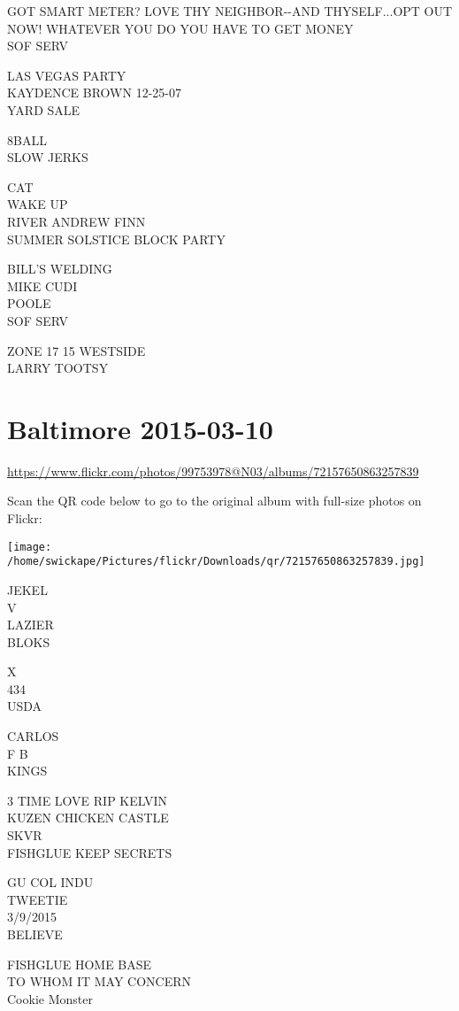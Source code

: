 \documentclass[10pt,letterpaper]{article}
\begin{document}
GOT SMART METER? LOVE THY NEIGHBOR{-}{-}AND THYSELF...OPT OUT NOW!  WHATEVER YOU DO YOU HAVE TO GET MONEY\\
SOF SERV

LAS VEGAS PARTY\\
KAYDENCE BROWN 12{-}25{-}07\\
YARD SALE

8BALL\\
SLOW JERKS

CAT\\
WAKE UP\\
RIVER ANDREW FINN\\
SUMMER SOLSTICE BLOCK PARTY

BILL'S WELDING\\
MIKE CUDI\\
POOLE\\
SOF SERV

ZONE 17 15 WESTSIDE\\
LARRY TOOTSY


\section*{Baltimore 2015-03-10}

\url{https://www.flickr.com/photos/99753978@N03/albums/72157650863257839}

Scan the QR code below to go to the original album with full-size photos on Flickr:

\texttt{[image: /home/swickape/Pictures/flickr/Downloads/qr/72157650863257839.jpg]}


JEKEL\\
V\\
LAZIER\\
BLOKS

X\\
434\\
USDA

CARLOS\\
F B\\
KINGS

3 TIME LOVE RIP KELVIN\\
KUZEN CHICKEN CASTLE\\
SKVR\\
FISHGLUE KEEP SECRETS

GU COL INDU\\
TWEETIE\\
3/9/2015\\
BELIEVE

FISHGLUE HOME BASE\\
TO WHOM IT MAY CONCERN\\
Cookie Monster
\end{document}
